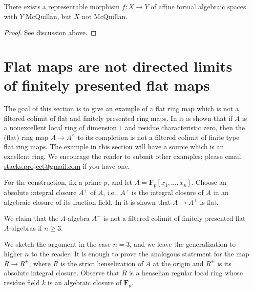 \begin{lemma}
\label{lemma-representable-morphism-affine-formal-not-mcquillan-top}
There exists a representable morphism $f : X \to Y$ of
affine formal algebraic spaces with $Y$ McQuillan, but $X$ not
McQuillan.
\end{lemma}

\begin{proof}
See discussion above.
\end{proof}









\section{Flat maps are not directed limits of finitely presented flat maps}
\label{section-flat-not-colimit-flat-finitely-presented}

\noindent
The goal of this section is to give an example of a flat ring map which
is not a filtered colimit of flat and finitely presented ring maps. In
\cite{gabber-nonexcellent} it is shown that if $A$ is a nonexcellent
local ring of dimension $1$ and residue characteristic zero, then the
(flat) ring map $A \to A^\wedge$ to its completion is not a filtered
colimit of finite type flat ring maps. The example in this section
will have a source which is an excellent ring. We encourage the reader
to submit other examples; please email
\href{mailto:stacks.project@gmail.com}{stacks.project@gmail.com}
if you have one.

\medskip\noindent
For the construction, fix a prime $p$, and let
$A = \mathbf{F}_p[x_1, \ldots, x_n]$.
Choose an absolute integral closure $A^+$ of $A$, i.e., $A^+$ is the
integral closure of $A$ in an algebraic closure of its fraction field.
In \cite[\S 6.7]{HHBigCM} it is shown that $A \to A^+$ is flat.

\medskip\noindent
We claim that the $A$-algebra $A^+$ is not a filtered colimit of finitely
presented flat $A$-algebras if $n \geq 3$.

\medskip\noindent
We sketch the argument in the case $n = 3$, and we leave the generalization to
higher $n$ to the reader. It is enough to prove the analogous statement for
the map $R \to R^+$, where $R$ is the strict henselization of $A$ at the
origin and $R^+$ is its absolute integral closure. Observe that $R$
is a henselian regular local ring whose residue field $k$ is an
algebraic closure of $\mathbf{F}_p$.

